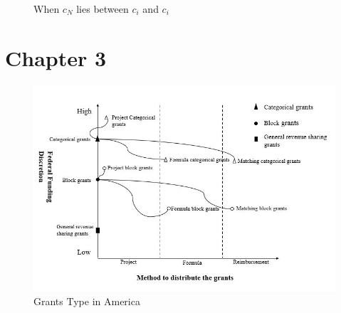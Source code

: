 \begin{figure}[htbp]
    \centering
    \caption{When $c_N$ lies between $c_i$ and $c_i$}
    \label{cnci2}
\end{figure}
\clearpage
\section{Chapter 3}
\begin{figure}[H]
    \centering
    \includegraphics[scale=0.8]{Chapter-3/Figures/grants type.JPG}
    \caption[Grants Type in America]{Grants Type in America
        \texttt{} }
    \label{grantstype}
\end{figure}


